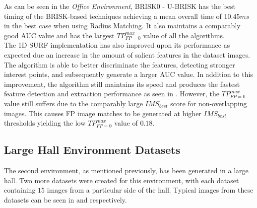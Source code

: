 As can be seen in the \textit{Office Environment}, BRISK0 - U-BRISK has the best timing of the BRISK-based techniques achieving a mean overall time of $10.45 ms$ in the best case when using Radius Matching. It also maintains a comparably good AUC value and has the largest $TP_{FP=0}^{max}$ value of all the algorithms.\\  

The 1D SURF implementation has also improved upon its performance as expected due an increase in the amount of salient features in the dataset images. The algorithm is able to better discriminate the features, detecting stronger interest points, and subsequently generate a larger AUC value. In addition to this improvement, the algorithm still maintains its speed and produces the fastest feature detection and extraction performance as seen in . However, the $TP_{FP=0}^{max}$ value still suffers due to the comparably large $IMS_{best}$ score for non-overlapping images. This causes FP image matches to be generated at higher $IMS_{best}$ thresholds yielding the low $TP_{FP=0}^{max}$ value of $0.18$. \\


\subsection{Large Hall Environment Datasets}
\label{sec:largeHall}
The second environment, as mentioned previously, has been generated in a large hall. Two more datasets were created for this environment, with each dataset containing $15$ images from a particular side of the hall. Typical images from these datasets can be seen in  and  respectively.\\ 

